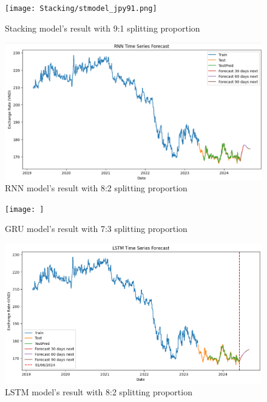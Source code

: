 \documentclass{ieeeojies}
\begin{document}
\begin{figure}[H]
  \centering
  \begin{minipage}{0.8\linewidth}
    \centering
    \texttt{[image: Stacking/stmodel\_jpy91.png]}
    \caption{Stacking model's result with 9:1 splitting proportion}
    \label{fig29}
  \end{minipage}
\end{figure}
\begin{figure}[H]
  \centering
  \begin{minipage}{0.8\linewidth}
    \centering
    \includegraphics[width=\linewidth]{RNN/rnn_jpy_82.png}
    \caption{RNN model's result with 8:2 splitting proportion}
    \label{fig30}
  \end{minipage}
\end{figure}
\begin{figure}[H]
  \centering
  \begin{minipage}{0.8\linewidth}
    \centering
    \texttt{[image: ]}
    \caption{GRU model's result with 7:3 splitting proportion}
    \label{fig31}
  \end{minipage}
\end{figure}
\begin{figure}[H]
  \centering
  \begin{minipage}{0.8\linewidth}
    \centering
    \includegraphics[width=\linewidth]{LSTM/lstm_jpy82.png}
    \caption{LSTM model's result with 8:2 splitting proportion}
    \label{fig32}
  \end{minipage}
\end{figure}
\end{document}
